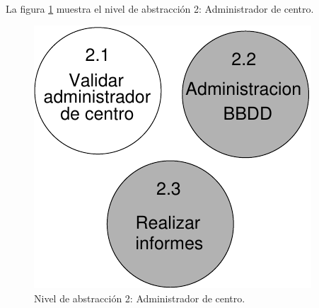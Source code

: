 \paragraph{}La figura \ref{diagramaNivel2-AdmCentro} muestra el nivel de
abstracción 2: Administrador de centro.

  \begin{figure}[!ht]
    \begin{center}
      \includegraphics[]{08.Analisis_Funcional/8.2.DFDs/Niveles/Nivel2/Diagramas/nivel2-AdmCentro.pdf}
      \caption{Nivel de abstracción 2: Administrador de centro.}
      \label{diagramaNivel2-AdmCentro}
    \end{center}
  \end{figure}
